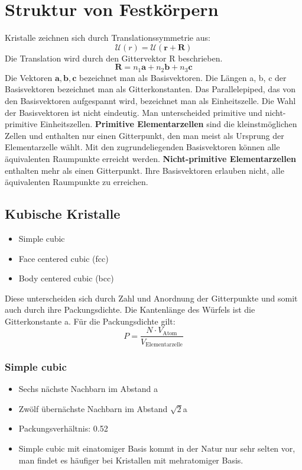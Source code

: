 \documentclass[11pt]{article}
\begin{document}
\section{Struktur von Festkörpern}
Kristalle zeichnen sich durch Translationssymmetrie aus:
\begin{equation}
  \mathcal{U}(r)= \mathcal{U}(\bm{r}+\bm{R})
\end{equation}
Die Translation wird durch den Gittervektor R beschrieben.
\begin{equation}
  \bm{R} = n_1\bm{a}+n_2\bm{b}+n_3\bm{c}
\end{equation}
Die Vektoren $\bm{a}, \bm{b}, \bm{c}$ bezeichnet man als Basisvektoren.
Die Längen a, b, c der Basisvektoren bezeichnet man als Gitterkonstanten. Das
Parallelepiped, das von den Basisvektoren aufgespannt wird, bezeichnet man als
Einheitszelle. Die Wahl der Basisvektoren ist nicht eindeutig. Man unterscheided
primitive und nicht-primitive Einheitszellen. \textbf{Primitive Elementarzellen}
sind die kleinstmöglichen Zellen und enthalten nur einen Gitterpunkt, den man
meist als Ursprung der Elementarzelle wählt. Mit den zugrundeliegenden
Basisvektoren können alle äquivalenten Raumpunkte erreicht werden.
\textbf{Nicht-primitive Elementarzellen} enthalten mehr als einen Gitterpunkt.
Ihre Basisvektoren erlauben nicht, alle äquivalenten Raumpunkte zu erreichen.
\subsection{Kubische Kristalle}
\begin{itemize}
  \item Simple cubic
  \item Face centered cubic (fcc)
  \item Body centered cubic (bcc)
\end{itemize}
Diese unterscheiden sich durch Zahl und Anordnung der Gitterpunkte und somit
auch durch ihre Packungsdichte. Die Kantenlänge des Würfels ist die
Gitterkonstante a.
Für die Packungsdichte gilt:
\begin{equation}
  P=\frac{N\cdot V_{\text{Atom}}}{V_{\text{Elementarzelle}}}
\end{equation}
\subsubsection{Simple cubic}
\begin{itemize}
  \item Sechs nächste Nachbarn im Abstand a
  \item Zwölf übernächste Nachbarn im Abstand $\sqrt{2}$a
  \item Packungsverhältnis: 0.52
  \item Simple cubic mit einatomiger Basis kommt in der Natur nur sehr selten
  vor, man findet es häufiger bei Kristallen mit mehratomiger Basis.
\end{itemize}
\end{document}
